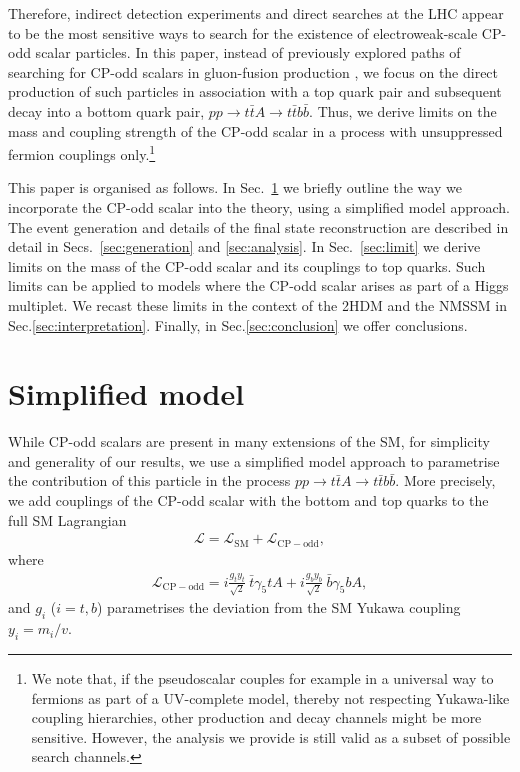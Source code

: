 \documentclass[preprintnumbers,superscriptaddress,nofootinbib,aps,prd,floatfix]{revtex4}
\begin{document}
Therefore, indirect detection experiments and direct searches at the LHC appear to be the most sensitive ways to search for the existence of electroweak-scale CP-odd scalar particles. In this paper, instead of previously explored paths of searching for CP-odd scalars in gluon-fusion production \cite{Klamke:2007cu,Dolan:2014upa}, we focus on the direct production of such particles in association with a top quark pair and subsequent decay into a bottom quark pair, $p p \to t \bar{t} A \to t \bar{t} b \bar{b}$. Thus, we derive limits on the mass and coupling strength of the CP-odd scalar in a process with unsuppressed fermion couplings only.\footnote{We note that, if the pseudoscalar couples for example in a universal way to fermions as part of a UV-complete model, thereby not respecting Yukawa-like coupling hierarchies, other production and decay channels might be more sensitive. However, the analysis we provide is still valid as a subset of possible search channels.}

This paper is organised as follows. In Sec.~\ref{sec:model} we briefly outline the way we incorporate the CP-odd scalar into the theory, using a simplified model approach. The event generation and details of the final state reconstruction are described in detail in Secs.~\ref{sec:generation} and \ref{sec:analysis}. In Sec.~\ref{sec:limit} we derive limits on the mass of the CP-odd scalar and its couplings to top quarks. Such limits can be applied to models where the CP-odd scalar arises as part of a Higgs multiplet. We recast these limits in the context of the 2HDM and the NMSSM in Sec.\ref{sec:interpretation}. Finally, in Sec.\ref{sec:conclusion} we offer conclusions.

\section{Simplified model}
\label{sec:model}
While CP-odd scalars are present in many extensions of the SM, for simplicity and generality of our results, we use a simplified model approach \cite{Alves:2011wf} to parametrise the contribution of this particle in the process $p p \to t \bar{t} A \to t \bar{t} b \bar{b}$. More precisely, we add couplings of the CP-odd scalar with the bottom and top quarks to the full SM Lagrangian 
\begin{eqnarray}
\mathcal{L} = \mathcal{L}_{\mathrm{SM}} + \mathcal{L}_{\mathrm{CP-odd}},
\label{eq:lagrangian}
\end{eqnarray}
where 
\begin{eqnarray}
\mathcal{L}_{\mathrm{CP-odd}} = i \frac{g_{t} y_t}{\sqrt{2}}~\bar{t} \gamma_5 t A + i \frac{g_{b} y_b}{\sqrt{2}}~\bar{b} \gamma_5 b A,
\end{eqnarray}
and $g_i$ ($i=t,b$) parametrises the deviation from the SM Yukawa coupling  $y_i = m_i/v$.
\end{document}
